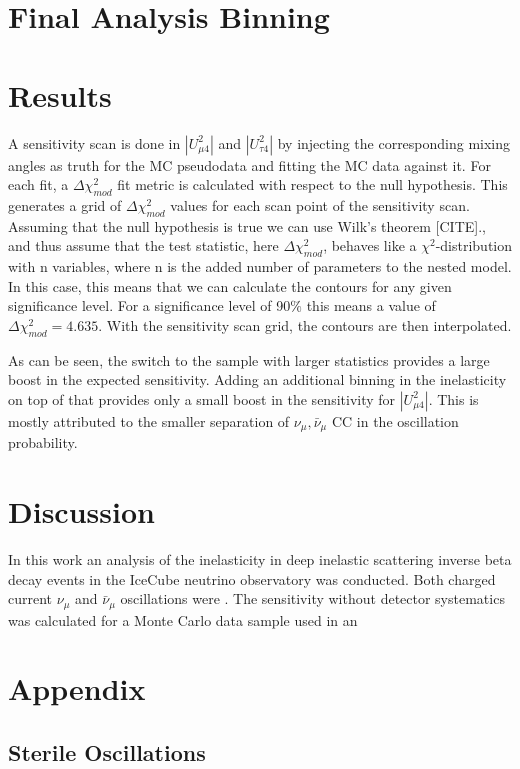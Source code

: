 \documentclass[a4paper,12pt,numbered]{article}
\begin{document}
\section{Final Analysis Binning}
\section{Results}

A sensitivity scan is done in $|U_{\mu 4}^2|$ and $|U_{\tau 4}^2|$ by injecting the corresponding mixing angles as truth for the MC pseudodata and fitting the MC data against it. For each fit, a $\Delta \chi_{mod}^2$ fit metric is calculated with respect to the null hypothesis. This generates a grid of $\Delta \chi_{mod}^2$ values for each scan point of the sensitivity scan. Assuming that the null hypothesis is true we can use Wilk's theorem [CITE]., and thus assume that the test statistic, here $\Delta \chi_{mod}^2$, behaves like a $\chi^2$-distribution with n variables, where n is the added number of parameters to the nested model. In this case, this means that we can calculate the contours for any given significance level. For a significance level of 90$\%$ this means a value of $\Delta \chi_{mod}^2=4.635$. With the sensitivity scan grid, the contours are then interpolated.


As can be seen, the switch to the sample with larger statistics provides a large boost in the expected sensitivity. Adding an additional binning in the inelasticity on top of that provides only a small boost in the sensitivity for $|U_{\mu 4}^2|$. This is mostly attributed to the smaller separation of $\nu_\mu, \bar{\nu}_\mu$ CC in the oscillation probability.


\section{Discussion}

In this work an analysis of the inelasticity in deep inelastic scattering inverse beta decay events in the IceCube neutrino observatory was conducted. Both charged current $\nu_\mu$ and $\bar{\nu}_\mu$ oscillations were . The sensitivity without detector systematics was calculated for a Monte Carlo data sample used in an





\appendix
\section{Appendix}
\subsection*{Sterile Oscillations}

\newpage\null\thispagestyle{empty}\newpage
\end{document}
